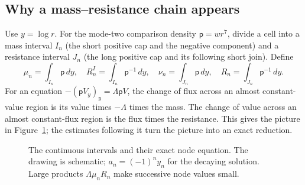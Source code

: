 \subsection{Why a mass--resistance chain appears}

Use $y=\log r$.  For the mode-two comparison density
$\mathsf p=wr^7$, divide a cell into a mass interval $I_n$ (the short
positive cap and the negative component) and a resistance interval
$J_n$ (the long positive cap and its following short join).  Define
\begin{equation}\label{eq:mass-resistance-def-new}
 \mu_n=\int_{I_n}\mathsf p\,dy,\quad
 R_n^I=\int_{I_n}\mathsf p^{-1}\,dy,\quad
 \nu_n=\int_{J_n}\mathsf p\,dy,\quad
 R_n=\int_{J_n}\mathsf p^{-1}\,dy.
\end{equation}
For an equation $-(\mathsf p V_y)_y=\Lambda\mathsf p V$, the change
of flux across an almost constant-value region is its value times
$-\Lambda$ times the mass.  The change of value across an almost
constant-flux region is the flux times the resistance.  This gives the
picture in Figure~\ref{fig:mass-resistance-chain}; the estimates following
it turn the picture into an exact reduction.

\begin{figure}[htbp]
\centering
{}
\caption{The continuous intervals and their exact node equation.
The drawing is schematic; $a_n=(-1)^ny_n$ for the decaying solution.
Large products $\Lambda\mu_nR_n$ make successive node values small.}
\label{fig:mass-resistance-chain}
\end{figure}

